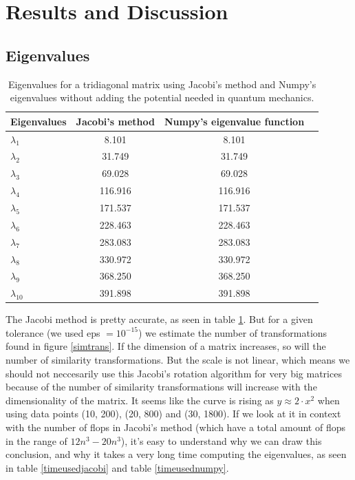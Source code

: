 \documentclass{article}
\begin{document}
\section{Results and Discussion}

\subsection{Eigenvalues}

\begin{table}[H]
    \centering
    \begin{tabular}{|l|c|c|r|}
    \hline
     Eigenvalues & Jacobi's method & Numpy's eigenvalue function\\
     \hline
      $\lambda_1$  & 8.101  & 8.101 \\
      $\lambda_2$  & 31.749  & 31.749 \\
      $\lambda_3$  & 69.028  & 69.028 \\
      $\lambda_4$  & 116.916  & 116.916 \\
      $\lambda_5$  & 171.537 & 171.537 \\
      $\lambda_6$  & 228.463  & 228.463 \\
      $\lambda_7$  & 283.083  & 283.083 \\
      $\lambda_8$  & 330.972 & 330.972 \\
      $\lambda_9$  & 368.250 & 368.250 \\
      $\lambda_{10}$ & 391.898 & 391.898 \\
      \hline
    \end{tabular}
    \caption{Eigenvalues for a tridiagonal matrix using Jacobi's method and Numpy's eigenvalues without adding the potential needed in quantum mechanics.}
    \label{eigenvalues}
\end{table}

The Jacobi method is pretty accurate, as seen in table \ref{eigenvalues}. But
for a given tolerance (we used eps $=10^{-15}$) we estimate the number of transformations found in figure \ref{simtrans}. If the dimension of a matrix increases, so will the number of similarity transformations.
But the scale is not linear, which means we should not neccesarily use this Jacobi's rotation algorithm for very big matrices because of the number of similarity transformations will increase with the dimensionality of the matrix. It seems like the curve is rising as $y \approx 2\cdot x^2$ when using data points (10, 200), (20, 800) and (30, 1800).
If we look at it in context with the number of flops in Jacobi's method (which have a total amount of flops in the range of $12n^3 - 20n^3$), it's easy to understand why we can draw this conclusion, and why it takes a very long time computing the eigenvalues, as seen in table \ref{timeusedjacobi} and table \ref{timeusednumpy}.
\end{document}
